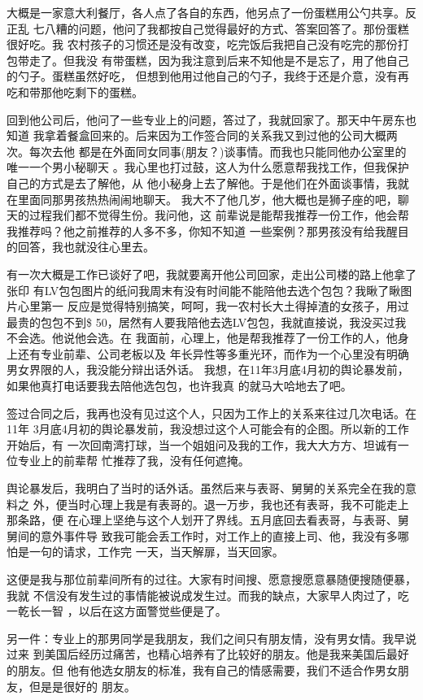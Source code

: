 \documentclass[12pt]{book}
\begin{document}
大概是一家意大利餐厅，各人点了各自的东西，他另点了一份蛋糕用公勺共享。反正乱
七八糟的问题，他问了我都按自己觉得最好的方式、答案回答了。那份蛋糕很好吃。我
农村孩子的习惯还是没有改变，吃完饭后我把自己没有吃完的那份打包带走了。但我没
有带蛋糕，因为我注意到后来不知他是不是忘了，用了他自己的勺子。蛋糕虽然好吃，
但想到他用过他自己的勺子，我终于还是介意，没有再吃和带那他吃剩下的蛋糕。

回到他公司后，他问了一些专业上的问题，答过了，我就回家了。那天中午房东也知道
我拿着餐盒回来的。后来因为工作签合同的关系我又到过他的公司大概两次。每次去他
都是在外面同女同事(朋友？)谈事情。而我也只能同他办公室里的唯一一个男小秘聊天
。我心里也打过鼓，这人为什么愿意帮我找工作，但我保护自己的方式是去了解他，从
他小秘身上去了解他。于是他们在外面谈事情，我就在里面同那男孩热热闹闹地聊天。
我大不了他几岁，他大概也是狮子座的吧，聊天的过程我们都不觉得生份。我问他，这
前辈说是能帮我推荐一份工作，他会帮我推荐吗？他之前推荐的人多不多，你知不知道
一些案例？那男孩没有给我醒目的回答，我也就没往心里去。

有一次大概是工作已谈好了吧，我就要离开他公司回家，走出公司楼的路上他拿了张印
有LV包包图片的纸问我周末有没有时间能不能陪他去选个包包？我瞅了瞅图片心里第一
反应是觉得特别搞笑，呵呵，我一农村长大土得掉渣的女孩子，用过最贵的包包不到\$
50，居然有人要我陪他去选LV包包，我就直接说，我没买过我不会选。他说他会选。在
我面前，心理上，他是帮我推荐了一份工作的人，他身上还有专业前辈、公司老板以及
年长异性等多重光环，而作为一个心里没有明确男女界限的人，我没能分辩出话外话。
我想，在11年3月底4月初的舆论暴发前，如果他真打电话要我去陪他选包包，也许我真
的就马大哈地去了吧。

签过合同之后，我再也没有见过这个人，只因为工作上的关系来往过几次电话。在11年
3月底4月初的舆论暴发前，我没想过这个人可能会有的企图。所以新的工作开始后，有
一次回南湾打球，当一个姐姐问及我的工作，我大大方方、坦诚有一位专业上的前辈帮
忙推荐了我，没有任何遮掩。

舆论暴发后，我明白了当时的话外话。虽然后来与表哥、舅舅的关系完全在我的意料之
外，便当时心理上我是有表哥的。退一万步，我也还有表哥，我不可能走上那条路，便
在心理上坚绝与这个人划开了界线。五月底回去看表哥，与表哥、舅舅间的意外事件导
致我可能会丢工作时，对工作上的直接上司、他，我没有多哪怕是一句的请求，工作完
一天，当天解扉，当天回家。

这便是我与那位前辈间所有的过往。大家有时间搜、愿意搜愿意暴随便搜随便暴，我就
不信没有发生过的事情能被说成发生过。而我的缺点，大家早人肉过了，吃一乾长一智
，以后在这方面警觉些便是了。

另一件：专业上的那男同学是我朋友，我们之间只有朋友情，没有男女情。我早说过来
到美国后经历过痛苦，也精心培养有了比较好的朋友。他是我来美国后最好的朋友。但
他有他选女朋友的标准，我有自己的情感需要，我们不适合作男女朋友，但是是很好的
朋友。
\end{document}
